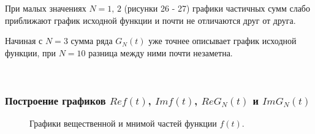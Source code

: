 \documentclass[a5paper, 10pt]{article}
\theoremstyle{definition}
\theoremstyle{plain}
\theoremstyle{remark}
\begin{document}
\newpage
При малых значениях $N = 1, \, 2$ (рисунки 26 - 27) графики частичных сумм слабо приближают график исходной функции и почти не отличаются друг от друга.

\newpage
Начиная с $N=3$ сумма ряда $G_N(t)$ уже точнее описывает график исходной функции, при $N=10$ разница между ними почти незаметна.

\newpage
\,
\newpage
\subsubsection{Построение графиков $Re f(t)$, $Im f(t)$, $Re G_N(t)$ и $Im G_N(t)$}

\begin{figure}[h]
\begin{minipage}[h]{0.5\linewidth}
\end{minipage}
\hfill
\begin{minipage}[h]{0.5\linewidth}
\end{minipage}
\caption{Графики вещественной и мнимой частей функции $f(t)$.}
\end{figure}
\end{document}
